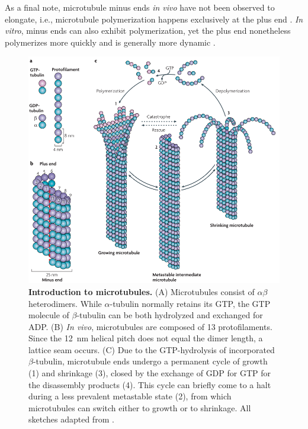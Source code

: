 As a final note, microtubule minus ends \textit{in vivo} have not been observed to elongate, i.e., microtubule polymerization happens exclusively at the plus end \parencite{dammer}. \textit{In vitro}, minus ends can also exhibit polymerization, yet the plus end nonetheless polymerizes more quickly and is generally more dynamic \parencite{Howard2003}. 

\begin{figure}[h!tb]
\centering
\includegraphics[width=\linewidth]{Figures/MTintro.png}
\caption[Introduction to microtubules.]{\textbf{Introduction to microtubules.}
(A) Microtubules consist of $\alpha\beta$ heterodimers. While $\alpha$-tubulin normally retains its GTP, the GTP molecule of $\beta$-tubulin can be both hydrolyzed and exchanged for ADP. (B) \textit{In vivo}, microtubules are composed of 13 protofilaments. Since the \SI{12}{\nm} helical pitch does not equal the dimer length, a lattice seam occurs. (C) Due to the GTP-hydrolysis of incorporated $\beta$-tubulin, microtubule ends undergo a permanent cycle of growth (1) and shrinkage (3), closed by the exchange of GDP for GTP for the disassembly products (4). This cycle can briefly come to a halt during a less prevalent metastable state (2), from which microtubules can switch either to growth or to shrinkage. All sketches adapted from \cite{Akhmanova2008}.
	}\label{MTintro}
\end{figure}

\FloatBarrier


